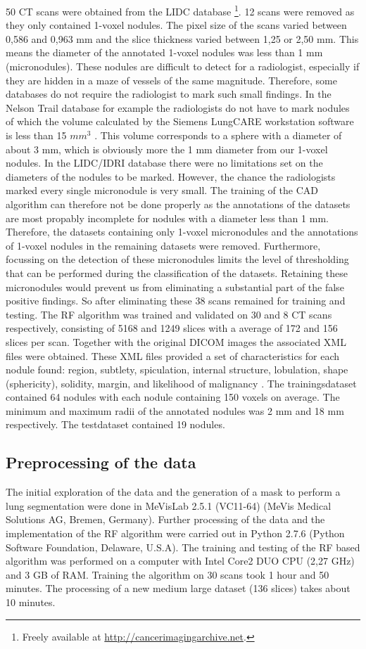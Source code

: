 50 CT scans were obtained from the LIDC database \footnote{Freely available
at \url{http://cancerimagingarchive.net}.}. 12 scans were removed as they only
contained 1-voxel nodules. The pixel size of the scans varied between 0,586 and
0,963 mm and the slice thickness varied between 1,25 or 2,50 mm. This means the
diameter of the annotated 1-voxel nodules was less than 1 mm (micronodules).
These nodules are difficult to detect for a radiologist, especially if they are
hidden in a maze of vessels of the same magnitude. Therefore, some databases do
not require the radiologist to mark such small findings. In the Nelson Trail
database for example the radiologists do not have to mark nodules of which the
volume calculated by the Siemens LungCARE workstation software is less than 15
$mm^3$ \cite{mur}. This volume corresponds to a sphere with a diameter of about
3 mm, which is obviously more the 1 mm diameter from our 1-voxel nodules.
In the LIDC/IDRI database there were no limitations set on the diameters of the
nodules to be marked. However, the chance the radiologists marked every single
micronodule is very small. The training of the CAD algorithm can therefore not
be done properly as the annotations of the datasets are most propably incomplete
for nodules with a diameter less than 1 mm. Therefore, the datasets containing
only 1-voxel micronodules and the annotations of 1-voxel nodules in the
remaining datasets were removed. Furthermore, focussing on the detection of
these micronodules limits the level of thresholding that can be performed during
the classification of the datasets. Retaining these micronodules would prevent
us from eliminating a substantial part of the false positive findings. So
after eliminating these 38 scans remained for training and testing.
The RF algorithm was trained and validated on 30 and 8 CT scans respectively,
consisting of 5168 and 1249 slices with a average of 172 and 156 slices per
scan. Together with the original DICOM images the associated XML files
were obtained. These XML files provided a set of characteristics for each nodule
found: region, subtlety, spiculation, internal structure, lobulation, shape
(sphericity), solidity, margin, and likelihood of malignancy \cite{lidcbase}.
The trainingsdataset contained 64 nodules with each nodule containing 150 voxels
on average. The minimum and maximum radii of the annotated nodules was 2 mm and
18 mm respectively. The testdataset contained 19 nodules.


\subsection{Preprocessing of the data} %
The initial exploration of the data and the generation of a mask to perform a
lung segmentation were done in MeVisLab 2.5.1 (VC11-64) (MeVis Medical Solutions
AG, Bremen, Germany). Further processing of the data and the implementation of
the RF algorithm were carried out in Python 2.7.6 (Python Software Foundation,
Delaware, U.S.A).  The training and testing of the RF based algorithm was
performed on a computer with Intel Core2 DUO CPU (2,27 GHz) and 3 GB of RAM.
Training the algorithm on 30 scans took 1 hour and 50 minutes. The processing of
a new medium large dataset (136 slices) takes about 10 minutes.

